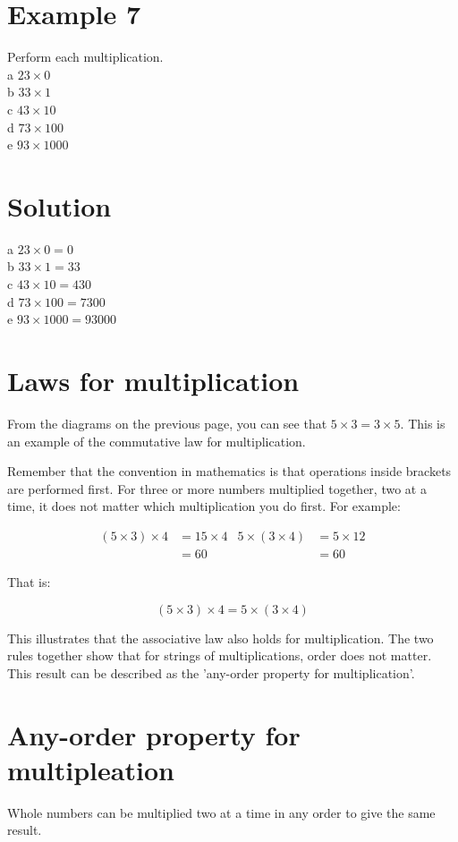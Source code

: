 \documentclass[10pt]{article}
\begin{document}
\section*{Example 7}
Perform each multiplication.\\
a \(23 \times 0\)\\
b \(33 \times 1\)\\
c \(43 \times 10\)\\
d \(73 \times 100\)\\
e \(93 \times 1000\)

\section*{Solution}
a \(23 \times 0=0\)\\
b \(33 \times 1=33\)\\
c \(43 \times 10=430\)\\
d \(73 \times 100=7300\)\\
e \(93 \times 1000=93000\)

\section*{Laws for multiplication}
From the diagrams on the previous page, you can see that \(5 \times 3=3 \times 5\). This is an example of the commutative law for multiplication.

Remember that the convention in mathematics is that operations inside brackets are performed first. For three or more numbers multiplied together, two at a time, it does not matter which multiplication you do first. For example:

\[
\begin{array}{rlrl}
(5 \times 3) \times 4 & =15 \times 4 & 5 \times(3 \times 4) & =5 \times 12 \\
& =60 & & =60
\end{array}
\]

That is:

\[
(5 \times 3) \times 4=5 \times(3 \times 4)
\]

This illustrates that the associative law also holds for multiplication. The two rules together show that for strings of multiplications, order does not matter. This result can be described as the 'any-order property for multiplication'.

\section*{Any-order property for multipleation}
Whole numbers can be multiplied two at a time in any order to give the same result.
\end{document}
